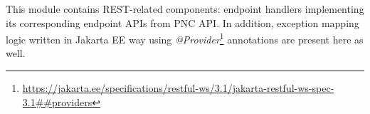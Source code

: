 \documentclass[../main.tex]{subfiles}
\begin{document}
This module contains REST-related components: endpoint handlers implementing its corresponding endpoint APIs from PNC API. In addition, exception mapping logic written in Jakarta EE way using \textit{@Provider}\footnote{\url{https://jakarta.ee/specifications/restful-ws/3.1/jakarta-restful-ws-spec-3.1##providers}} annotations are present here as well.
\end{document}
